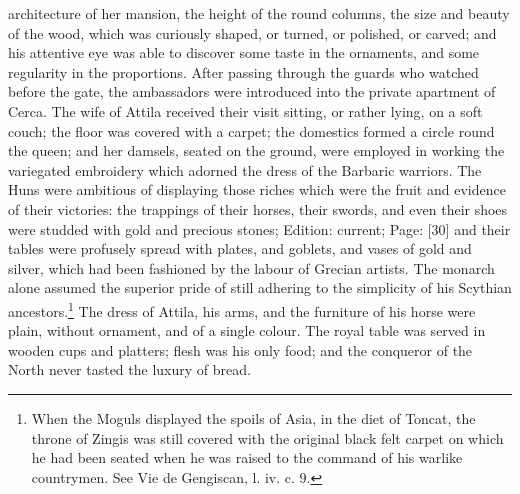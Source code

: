 architecture of her mansion, the height of the round columns, the size and beauty of the wood, which was curiously shaped, or turned, or polished, or carved; and his attentive eye was able to discover some taste in the ornaments, and some regularity in the proportions. After passing through the guards who watched before the gate, the ambassadors were introduced into the private apartment of Cerca. The wife of Attila received their visit sitting, or rather lying, on a soft couch; the floor was covered with a carpet; the domestics formed a circle round the queen; and her damsels, seated on the ground, were employed in working the variegated embroidery which adorned the dress of the Barbaric warriors. The Huns were ambitious of displaying those riches which were the fruit and evidence of their victories: the trappings of their horses, their swords, and even their shoes were studded with gold and precious stones; Edition: current; Page: [30] and their tables were profusely spread with plates, and goblets, and vases of gold and silver, which had been fashioned by the labour of Grecian artists. The monarch alone assumed the superior pride of still adhering to the simplicity of his Scythian ancestors.\footnote{When the Moguls displayed the spoils of Asia, in the diet of Toncat, the throne of Zingis was still covered with the original black felt carpet on which he had been seated when he was raised to the command of his warlike countrymen. See Vie de Gengiscan, l. iv. c. 9.} The dress of Attila, his arms, and the furniture of his horse were plain, without ornament, and of a single colour. The royal table was served in wooden cups and platters; flesh was his only food; and the conqueror of the North never tasted the luxury of bread.

